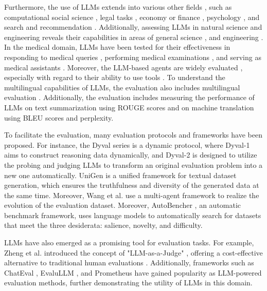 Furthermore, the use of LLMs extends into various other fields \cite{gu2023xiezhi}, such as computational social science \cite{ziems2023large}, legal tasks \cite{nay2023large, guha2023legalbench, fei2023lawbench}, economy or finance \cite{Zhang2023FinEvalAC, Zhang2024FinSQLML, Xie2023PIXIUAL, Su2024NumLLMNL, li2023chatgpt, islam2023financebench}, psychology \cite{fmc2023, li2024quantifying}, and search and recommendation \cite{fan2023recommender, lei2023recexplainer}. Additionally, assessing LLMs in natural science and engineering reveals their capabilities in areas of general science \cite{guo2023large, Nascimento2023, Chen2024ScholarChemQAUT}, and engineering \cite{pallagani2023understanding, sridhara2023chatgpt, Song2024CSBenchAC}. In the medical domain, LLMs have been tested for their effectiveness in responding to medical queries \cite{Holmes_2023, Samaan2023}, performing medical examinations \cite{GilsonAidan2023, 10.1371/journal.pdig.0000198}, and serving as medical assistants \cite{wang2023llms, Lahat2023}. Moreover, the LLM-based agents are widely evaluated \cite{lin2023agentsims, agentbench}, especially with regard to their ability to use tools \cite{qin2023toolllm, metatool, li2023apibank}. To understand the multilingual capabilities of LLMs, the evaluation also includes multilingual evaluation \cite{Xu2023SuperCLUEAC, li2023cmmlu, Lai2023ChatGPTBE}. Additionally, the evaluation includes measuring the performance of LLMs on text summarization using ROUGE scores and on machine translation using BLEU scores and perplexity.


To facilitate the evaluation, many evaluation protocols and frameworks have been proposed. For instance, the Dyval \cite{zhu2023dyval, Zhu2024DyVal2D} series is a dynamic protocol, where Dyval-1 \cite{zhu2023dyval} aims to construct reasoning data dynamically, and Dyval-2 \cite{Zhu2024DyVal2D} is designed to utilize the probing and judging LLMs to transform an original evaluation problem into a new one automatically. UniGen \cite{wu2024unigen} is a unified framework for textual dataset generation, which ensures the truthfulness and diversity of the generated data at the same time. Moreover, Wang et al. \cite{wang2024benchmark} use a multi-agent framework to realize the evolution of the evaluation dataset. Moreover, AutoBencher \cite{Li2024AutoBencherCS}, an automatic benchmark framework, uses language models to automatically search for datasets that meet the three desiderata: salience, novelty, and difficulty.

LLMs have also emerged as a promising tool for evaluation tasks. For example, Zheng et al. introduced the concept of "LLM-as-a-Judge" \cite{zheng2023judging}, offering a cost-effective alternative to traditional human evaluations \cite{li2024generation}. Additionally, frameworks such as ChatEval \cite{chan2023chateval}, EvaluLLM \cite{EvaluLLM}, and Prometheus \cite{kim2023prometheus, kim2024prometheus} have gained popularity as LLM-powered evaluation methods, further demonstrating the utility of LLMs in this domain.


